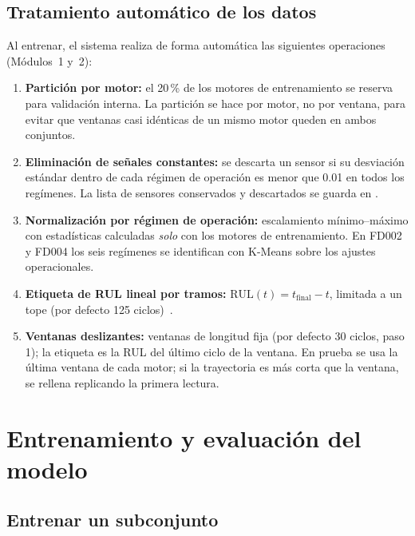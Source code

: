 \documentclass[letterpaper]{article}
\newcommand{\ruta}[1]{\path{#1}}
\begin{document}
\subsection{Tratamiento automático de los datos}

Al entrenar, el sistema realiza de forma automática las siguientes operaciones
(Módulos~1 y~2):

\begin{enumerate}[leftmargin=*, label=\arabic*.]
    \item \textbf{Partición por motor:} el 20\,\% de los motores de entrenamiento
          se reserva para validación interna. La partición se hace por motor, no
          por ventana, para evitar que ventanas casi idénticas de un mismo motor
          queden en ambos conjuntos.
    \item \textbf{Eliminación de señales constantes:} se descarta un sensor si su
          desviación estándar dentro de cada régimen de operación es menor que
          0.01 en todos los regímenes. La lista de sensores conservados y
          descartados se guarda en \ruta{metrics.json}.
    \item \textbf{Normalización por régimen de operación:} escalamiento mínimo--máximo
          con estadísticas calculadas \emph{solo} con los motores de entrenamiento.
          En FD002 y FD004 los seis regímenes se identifican con K-Means sobre
          los ajustes operacionales.
    \item \textbf{Etiqueta de RUL lineal por tramos:} $\text{RUL}(t)=t_{\text{final}}-t$,
          limitada a un tope (por defecto 125 ciclos)~\cite{heimes2008rnn}.
    \item \textbf{Ventanas deslizantes:} ventanas de longitud fija (por defecto 30
          ciclos, paso 1); la etiqueta es la RUL del último ciclo de la ventana.
          En prueba se usa la última ventana de cada motor; si la trayectoria es
          más corta que la ventana, se rellena replicando la primera lectura.
\end{enumerate}

\section{Entrenamiento y evaluación del modelo}
\label{sec:entrenamiento}

\subsection{Entrenar un subconjunto}
\end{document}
